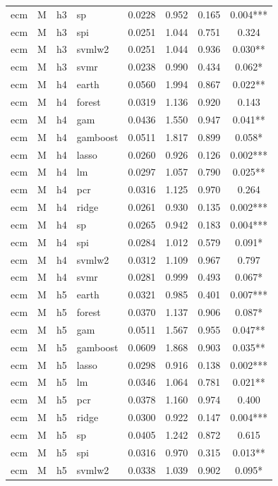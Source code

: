 \begin{ThreePartTable}
\begin{longtable}[t]{llclcccc}
ecm & M & h3 & sp & 0.0228 & 0.952 & 0.165 & 0.004***\\
ecm & M & h3 & spi & 0.0251 & 1.044 & 0.751 & 0.324\\
ecm & M & h3 & svmlw2 & 0.0251 & 1.044 & 0.936 & 0.030**\\
ecm & M & h3 & svmr & 0.0238 & 0.990 & 0.434 & 0.062*\\
\addlinespace
ecm & M & h4 & earth & 0.0560 & 1.994 & 0.867 & 0.022**\\
ecm & M & h4 & forest & 0.0319 & 1.136 & 0.920 & 0.143\\
ecm & M & h4 & gam & 0.0436 & 1.550 & 0.947 & 0.041**\\
ecm & M & h4 & gamboost & 0.0511 & 1.817 & 0.899 & 0.058*\\
ecm & M & h4 & lasso & 0.0260 & 0.926 & 0.126 & 0.002***\\
ecm & M & h4 & lm & 0.0297 & 1.057 & 0.790 & 0.025**\\
ecm & M & h4 & pcr & 0.0316 & 1.125 & 0.970 & 0.264\\
ecm & M & h4 & ridge & 0.0261 & 0.930 & 0.135 & 0.002***\\
ecm & M & h4 & sp & 0.0265 & 0.942 & 0.183 & 0.004***\\
ecm & M & h4 & spi & 0.0284 & 1.012 & 0.579 & 0.091*\\
ecm & M & h4 & svmlw2 & 0.0312 & 1.109 & 0.967 & 0.797\\
ecm & M & h4 & svmr & 0.0281 & 0.999 & 0.493 & 0.067*\\
\addlinespace
ecm & M & h5 & earth & 0.0321 & 0.985 & 0.401 & 0.007***\\
ecm & M & h5 & forest & 0.0370 & 1.137 & 0.906 & 0.087*\\
ecm & M & h5 & gam & 0.0511 & 1.567 & 0.955 & 0.047**\\
ecm & M & h5 & gamboost & 0.0609 & 1.868 & 0.903 & 0.035**\\
ecm & M & h5 & lasso & 0.0298 & 0.916 & 0.138 & 0.002***\\
ecm & M & h5 & lm & 0.0346 & 1.064 & 0.781 & 0.021**\\
ecm & M & h5 & pcr & 0.0378 & 1.160 & 0.974 & 0.400\\
ecm & M & h5 & ridge & 0.0300 & 0.922 & 0.147 & 0.004***\\
ecm & M & h5 & sp & 0.0405 & 1.242 & 0.872 & 0.615\\
ecm & M & h5 & spi & 0.0316 & 0.970 & 0.315 & 0.013**\\
ecm & M & h5 & svmlw2 & 0.0338 & 1.039 & 0.902 & 0.095*\\

\end{longtable}
\end{ThreePartTable}
